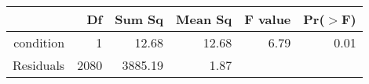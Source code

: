 \begin{table}[ht]
\centering
\begin{tabular}{rrrrrr}
  \hline
 & Df & Sum Sq & Mean Sq & F value & Pr($>$F) \\ 
  \hline
condition &   1 & 12.68 & 12.68 & 6.79 & 0.01 \\ 
  Residuals & 2080 & 3885.19 & 1.87 &  &  \\ 
   \hline
\end{tabular}
\end{table}
